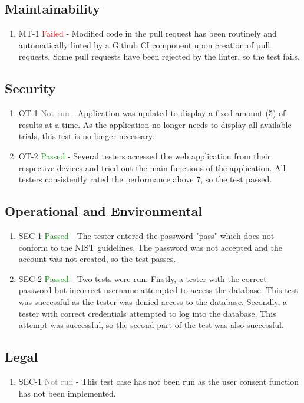 \documentclass[12pt, titlepage]{article}
\begin{document}
\subsection{Maintainability}
\begin{enumerate}
  \item MT-1 \textcolor{red}{Failed} - Modified code in the pull request has been routinely and automatically linted by a Github CI component upon creation of pull requests. Some pull requests have been rejected by the linter, so the test fails.
\end{enumerate}

\subsection{Security}
\begin{enumerate}
  \item OT-1 \textcolor{gray}{Not run} - Application was updated to display a fixed amount (5) of results at a time. As the application no longer needs to display all available trials, this test is no longer necessary.
  \item OT-2 \textcolor{green}{Passed} - Several testers accessed the web application from their respective devices and tried out the main functions of the application. All testers consistently rated the performance above 7, so the test passed.
\end{enumerate}

\subsection{Operational and Environmental}
\begin{enumerate}
  \item SEC-1 \textcolor{green}{Passed} - The tester entered the password "pass" which does not conform to the NIST guidelines. The password was not accepted and the account was not created, so the test passes.
  \item SEC-2 \textcolor{green}{Passed} - Two tests were run. Firstly, a tester with the correct password but incorrect username attempted to access the database. This test was successful as the tester was denied access to the database. Secondly, a tester with correct credentials attempted to log into the database. This attempt was successful, so the second part of the test was also successful.
\end{enumerate}

\subsection{Legal}
\begin{enumerate}
  \item SEC-1 \textcolor{gray}{Not run} - This test case has not been run as the user consent function has not been implemented.
\end{enumerate}
\end{document}
